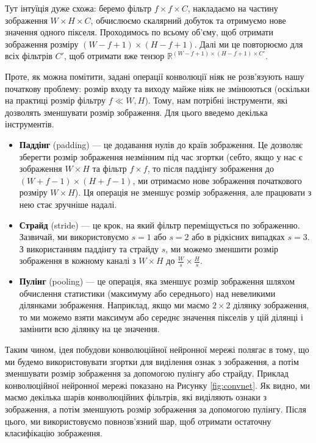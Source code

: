 Тут інтуїція дуже схожа: беремо фільтр $f \times f \times C$, накладаємо на
частину зображення $W \times H \times C$, обчислюємо скалярний добуток та
отримуємо нове значення одного пікселя. Проходимось по всьому об'єму, щоб
отримати зображення розміру $(W-f+1) \times (H-f+1)$. Далі ми це повторюємо для
всіх фільтрів $C'$, щоб отримати вже тензор $\mathbb{R}^{(W-f+1) \times (H-f+1)
\times C'}$. 


Проте, як можна помітити, задані операції конволюції ніяк не розв'язують нашу
початкову проблему: розмір входу та виходу майже ніяк не змінюються (оскільки на
практиці розмір фільтру $f \ll W,H$). Тому, нам потрібні інструменти, які
дозволять зменшувати розмір зображення. Для цього введемо декілька інструментів.
\begin{itemize}
    \item \textbf{Паддінг} (padding) --- це додавання нулів до країв зображення.
    Це дозволяє зберегти розмір зображення незмінним під час згортки (себто, 
    якщо у нас є зображення $W \times H$ та фільтр $f \times f$, то після
    паддінгу зображення до $(W+f-1) \times (H+f-1)$, ми отримаємо нове
    зображення початкового розміру $W \times H$). Ця операція не зменшує 
    розмір зображення, але працювати з нею стає зручніше надалі.
    \item \textbf{Страйд} (stride) --- це крок, на який фільтр переміщується по
    зображенню. Зазвичай, ми використовуємо $s=1$ або $s=2$ або в рідкісних
    випадках $s=3$. З використанням паддінгу та страйду $s$, ми можемо зменшити
    розмір зображення в кожному каналі з $W \times H$ до $\frac{W}{s} \times
    \frac{H}{s}$.
    \item \textbf{Пулінг} (pooling) --- це операція, яка зменшує розмір
    зображення шляхом обчислення статистики (максимуму або середнього) над
    невеликими ділянками зображення. Наприклад, якщо ми маємо $2 \times 2$
    ділянку зображення, то ми можемо взяти максимум або середнє значення
    пікселів у цій ділянці і замінити всю ділянку на це значення.
\end{itemize}

Таким чином, ідея побудови конволюційної нейронної мережі полягає в тому, що ми
будемо використовувати згортки для виділення ознак з зображення, а потім
зменшувати розмір зображення за допомогою пулінгу або страйду. Приклад
конволюційної нейронної мережі показано на Рисунку \ref{fig:convnet}. Як видно,
ми маємо декілька шарів конволюційних фільтрів, які виділяють ознаки з
зображення, а потім зменшують розмір зображення за допомогою пулінгу. Після
цього, ми використовуємо повнозв'язний шар, щоб отримати остаточну класифікацію
зображення. 

